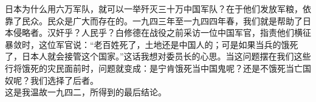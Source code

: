 日本为什么用六万军队，就可以一举歼灭三十万中国军队？在于他们发放军粮，依靠了民众。民众是广大而存在的。一九四三年至一九四四年春，我们就是帮助了日本侵略者。汉奸乎？人民乎？白修德在战役之前采访一位中国军官，指责他们横征暴敛时，这位军官说：“老百姓死了，土地还是中国人的；可是如果当兵的饿死了，日本人就会接管这个国家。”这话我想对委员长的心思。当这问题摆在我们这些行将饿死的灾民面前时，问题就变成：是宁肯饿死当中国鬼呢？还是不饿死当亡国奴呢？我们选择了后者。\\

这是我温故一九四二，所得到的最后结论。\\